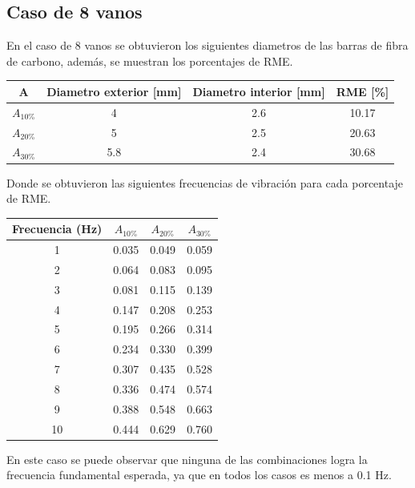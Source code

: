 \subsection{Caso de 8 vanos}
En el caso de 8 vanos se obtuvieron los siguientes diametros de las barras de fibra de carbono, además, se muestran los porcentajes de RME.

\begin{table}[H]
    \centering
    \begin{tabular}{cccc}
    \toprule
     A & Diametro exterior [mm] & Diametro interior [mm] & RME [\%] \\
    \midrule
     $A_{10\%}$ &  4 &  2.6 &  10.17 \\
     $A_{20\%}$ &  5 &  2.5 &  20.63 \\
     $A_{30\%}$ &  5.8 &  2.4 &  30.68 \\
    \bottomrule
    \end{tabular}
\end{table}

Donde se obtuvieron las siguientes frecuencias de vibración para cada porcentaje de RME.

\begin{table}[H]
    \centering
    \begin{tabular}{cccc}
    \toprule
     Frecuencia (Hz) & $A_{10\%}$ & $A_{20\%}$ & $A_{30\%}$ \\
    \midrule
     1 &       0.035 &       0.049 &       0.059 \\
     2 &       0.064 &       0.083 &       0.095 \\
     3 &       0.081 &       0.115 &       0.139 \\
     4 &       0.147 &       0.208 &       0.253 \\
     5 &       0.195 &       0.266 &       0.314 \\
     6 &       0.234 &       0.330 &       0.399 \\
     7 &       0.307 &       0.435 &       0.528 \\
     8 &       0.336 &       0.474 &       0.574 \\
     9 &       0.388 &       0.548 &       0.663 \\
     10 &       0.444 &       0.629 &       0.760 \\
    \bottomrule
    \end{tabular}
\end{table}

En este caso se puede observar que ninguna de las combinaciones logra la frecuencia fundamental esperada, ya que en todos los casos es menos a 0.1 Hz.

